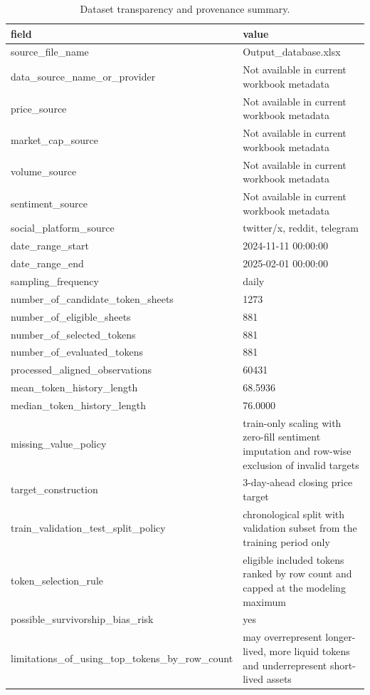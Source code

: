 \begin{table}[htbp]
\centering
\begin{tabular}{ll}
\hline
field & value \\
\hline
source_file_name & Output_database.xlsx \\
data_source_name_or_provider & Not available in current workbook metadata \\
price_source & Not available in current workbook metadata \\
market_cap_source & Not available in current workbook metadata \\
volume_source & Not available in current workbook metadata \\
sentiment_source & Not available in current workbook metadata \\
social_platform_source & twitter/x, reddit, telegram \\
date_range_start & 2024-11-11 00:00:00 \\
date_range_end & 2025-02-01 00:00:00 \\
sampling_frequency & daily \\
number_of_candidate_token_sheets & 1273 \\
number_of_eligible_sheets & 881 \\
number_of_selected_tokens & 881 \\
number_of_evaluated_tokens & 881 \\
processed_aligned_observations & 60431 \\
mean_token_history_length & 68.5936 \\
median_token_history_length & 76.0000 \\
missing_value_policy & train-only scaling with zero-fill sentiment imputation and row-wise exclusion of invalid targets \\
target_construction & 3-day-ahead closing price target \\
train_validation_test_split_policy & chronological split with validation subset from the training period only \\
token_selection_rule & eligible included tokens ranked by row count and capped at the modeling maximum \\
possible_survivorship_bias_risk & yes \\
limitations_of_using_top_tokens_by_row_count & may overrepresent longer-lived, more liquid tokens and underrepresent short-lived assets \\
\hline
\end{tabular}
\caption{Dataset transparency and provenance summary.}
\label{table_dataset_transparency}
\end{table}